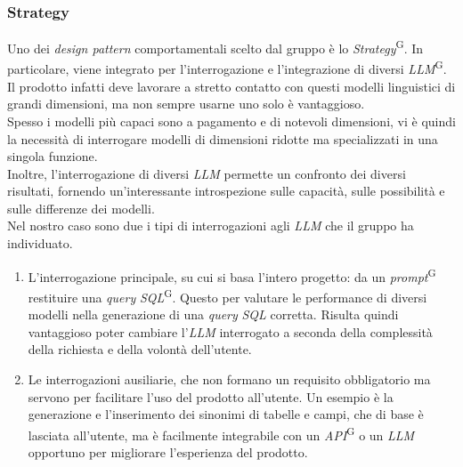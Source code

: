 \documentclass[5pt]{article}
\begin{document}
		\subsubsection{Strategy}
			Uno dei \textit{design pattern} comportamentali scelto dal gruppo è lo \textit{Strategy}\textsuperscript{G}. 
			In particolare, viene integrato per l'interrogazione e l'integrazione di diversi \textit{LLM}\textsuperscript{G}. 
			Il prodotto infatti deve lavorare a stretto contatto con questi modelli linguistici di grandi dimensioni, ma non sempre usarne uno solo è vantaggioso.  \\
			
			Spesso i modelli più capaci sono a pagamento e di notevoli dimensioni, vi è quindi la necessità di interrogare modelli di dimensioni ridotte ma specializzati in una singola funzione. \\
			
			Inoltre, l'interrogazione di diversi \textit{LLM} permette un confronto dei diversi risultati, fornendo un'interessante introspezione sulle capacità, sulle possibilità e sulle differenze dei modelli. \\
			
			Nel nostro caso sono due i tipi di interrogazioni agli \textit{LLM} che il gruppo ha individuato.
			\begin{enumerate}
				\item L'interrogazione principale, su cui si basa l'intero progetto: da un \textit{prompt}\textsuperscript{G} restituire una \textit{query} \textit{SQL}\textsuperscript{G}. 
				Questo per valutare le performance di diversi modelli nella generazione di una \textit{query} \textit{SQL} corretta. 
				Risulta quindi vantaggioso poter cambiare l'\textit{LLM} interrogato a seconda della complessità della richiesta e della volontà dell'utente. 
				
				\item Le interrogazioni ausiliarie, che non formano un requisito obbligatorio ma servono per facilitare l'uso del prodotto all'utente. 
					Un esempio è la generazione e l'inserimento dei sinonimi di tabelle e campi, che di base è lasciata all'utente, 
					ma è facilmente integrabile con un \textit{API}\textsuperscript{G} o un \textit{LLM} opportuno per migliorare l'esperienza del prodotto.
			\end{enumerate}
	
\end{document}
